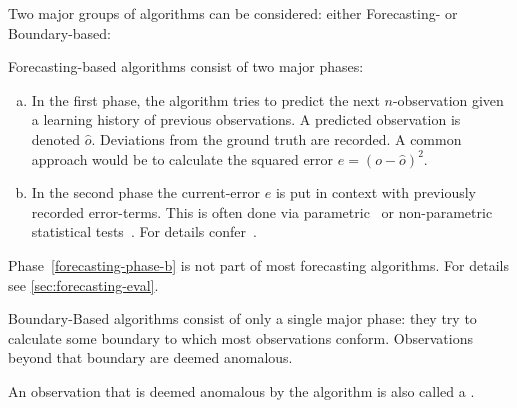 Two major groups of algorithms can be considered: either Forecasting- or
Boundary-based:
\begin{definition}\label{def:forecasting-based-algo}
    Forecasting-based algorithms consist of two major phases:
    \begin{enumerate}[a.)]
        \item In the first phase, the algorithm tries to predict the next \(n\)-observation
        given a learning history of previous observations. A predicted observation
        is denoted \(\hat{o}\). Deviations from the ground truth are recorded.
        A common approach would be to calculate the squared error \(e = {\left(o - \hat{o}\right)}^2\).
        \item In the second phase the current-error \(e\) is put in context with
        previously recorded error-terms. This is often done via 
        parametric~\cite{Malhotra.2015,Ahmad.2017,Guo.2016,Malhotra.2016,Shipmon.2017,Chauhan.2015} or 
        non-parametric statistical tests~\cite{Zhu.2017,Hundman.2018,Maimo.2018,Su.2019}.
        For details confer~\cite{Zietlow.2020}.\label{forecasting-phase-b}
    \end{enumerate}
    Phase~\ref{forecasting-phase-b} is not part of most forecasting algorithms.
    For details see \cref{sec:forecasting-eval}.
\end{definition}

\begin{definition}\label{def:boundary-based-algo}
    Boundary-Based algorithms consist of only a single major phase:
    they try to calculate some boundary to which most observations conform.
    Observations beyond that boundary are deemed anomalous.
\end{definition}

\begin{definition}[Detection]\label{def:detection}
    An observation that is deemed anomalous by the algorithm is also called a
    .
\end{definition}
